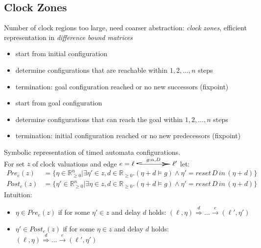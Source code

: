 \documentclass[a4paper, 10pt]{article}
\begin{document}
\subsection{Clock Zones}
Number of clock regions too large, need coarser abstraction: \emph{clock zones}, efficient representation in \emph{difference bound matrices}

\begin{mdframed}[roundcorner=5pt,
subtitlebelowline=false,subtitleaboveline=false,
subtitlebackgroundcolor=blue!30,
frametitlerule=true,
frametitlebackgroundcolor=blue!30,
frametitle={Forward Analysis}
]
\begin{itemize}
    \item start from initial configuration
    \item determine configurations that are reachable within $1,2,\dots,n$ steps
    \item termination: goal configuration reached or no new successors (\follows fixpoint)
\end{itemize}
\begin{itemize}
    \item start from goal configuration
    \item determine configurations that can reach the goal within $1,2,\dots,n$ steps
    \item termination: initial configuration reached or no new predecessors (\follows fixpoint)
\end{itemize}
Symbolic representation of timed automata configurations.\\
For set $z$ of clock valuations and edge $e=\ell\overset{g:\alpha, D}{\scalebox{5}[1]{$\hookrightarrow$}}\ell'$ let:
\begin{align*}
Pre_e(z) &= \{ \eta\in\mathds{R}^n_{\geq0} | \exists\eta'\in z,d\in\mathds{R}_{\geq0}.(\eta+d\models g)\wedge\eta' = reset\,D\,in\, (\eta+d)\} \\
Post_e(z) &= \{ \eta'\in\mathds{R}^n_{\geq0} | \exists\eta\in z,d\in\mathds{R}_{\geq0}.(\eta+d\models g)\wedge\eta' = reset\,D\,in\, (\eta+d)\}
\end{align*}
Intuition:
\begin{itemize}
    \item $\eta\in Pre_e(z)$ if for some $\eta'\in z$ and delay $d$ holds: $(\ell,\eta)\overset{d}{\Longrightarrow}\dots\overset{e}{\longrightarrow}(\ell',\eta')$
    \item $\eta'\in Post_e(z)$ if for some $\eta\in z$ and delay $d$ holds: $(\ell,\eta)\overset{d}{\Longrightarrow}\dots\overset{e}{\longrightarrow}(\ell',\eta')$

\end{itemize}
\end{mdframed}
\end{document}
